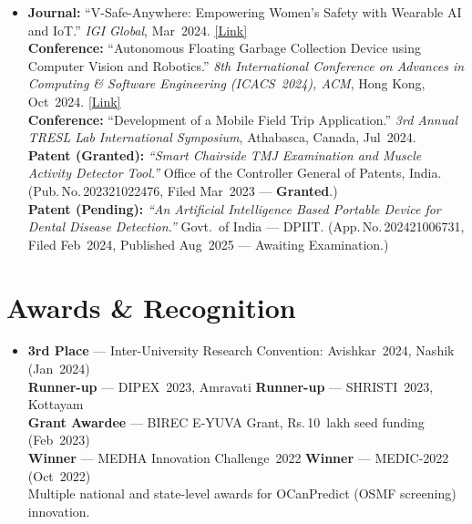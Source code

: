 \documentclass[letterpaper,11pt]{article}
\newcommand{\pnum}[1]{Pub.\,No.\,#1}
\newcommand{\anum}[1]{App.\,No.\,#1}
\newcommand{\resumeSubHeadingListStart}{
  \begin{itemize}[leftmargin=0.13in, label={}, itemsep=2pt, parsep=0pt]
}
\newcommand{\resumeSubHeadingListEnd}{\end{itemize}}
\begin{document}
\resumeSubHeadingListStart
  \item\small{
    \textbf{Journal:} ``V-Safe-Anywhere: Empowering Women's Safety with Wearable AI and IoT.'' \textit{IGI Global}, Mar~2024. \href{https://www.igi-global.com/chapter/v-safe-anywhere/342150}{\underline{[Link]}} \\[2pt]
    \textbf{Conference:} ``Autonomous Floating Garbage Collection Device using Computer Vision and Robotics.'' \textit{8th International Conference on Advances in Computing \& Software Engineering (ICACS~2024), ACM}, Hong Kong, Oct~2024. \href{https://dl.acm.org/doi/10.1145/3693939.3693957}{\underline{[Link]}} \\[2pt]
    \textbf{Conference:} ``Development of a Mobile Field Trip Application.'' \textit{3rd Annual TRESL Lab International Symposium}, Athabasca, Canada, Jul~2024. \\[2pt]
    \textbf{Patent (Granted):} \textit{``Smart Chairside TMJ Examination and Muscle Activity Detector Tool.''} Office of the Controller General of Patents, India. (\pnum{202321022476}, Filed Mar~2023 — \textbf{Granted}.) \\[2pt]
    \textbf{Patent (Pending):} \textit{``An Artificial Intelligence Based Portable Device for Dental Disease Detection.''} Govt.\ of India — DPIIT. (\anum{202421006731}, Filed Feb~2024, Published Aug~2025 — Awaiting Examination.)
  }
\resumeSubHeadingListEnd

\section{Awards \& Recognition}

\resumeSubHeadingListStart
  \item\small{
    \textbf{3rd Place} — Inter-University Research Convention: Avishkar~2024, Nashik (Jan~2024) \\[2pt]
    \textbf{Runner-up} — DIPEX~2023, Amravati \hspace{2em} \textbf{Runner-up} — SHRISTI~2023, Kottayam \\[2pt]
    \textbf{Grant Awardee} — BIREC E-YUVA Grant, Rs.\,10~lakh seed funding (Feb~2023) \\[2pt]
    \textbf{Winner} — MEDHA Innovation Challenge~2022 \hspace{2em} \textbf{Winner} — MEDIC-2022 (Oct~2022) \\[2pt]
    Multiple national and state-level awards for OCanPredict (OSMF screening) innovation.
  }
\resumeSubHeadingListEnd
\end{document}

